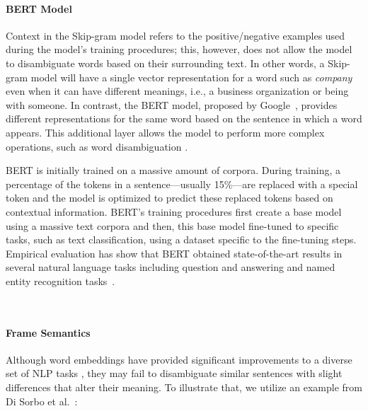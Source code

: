 



\paragraph{\textbf{BERT Model}}
\label{cp5:bert}

Context in the Skip-gram model refers to the positive/negative examples used during the model's training procedures; this, however, does not allow the model to disambiguate words based on their surrounding text. In other words, a Skip-gram model will have a single vector representation for a word such as \textit{company} even when it can have different meanings, i.e., a business organization or being with someone. In contrast, 
the \acf{BERT} model, proposed by Google~\cite{Devlin2018Bert}, provides different representations for the same word based on the sentence in which a word appears.
This additional layer allows the model to perform more complex operations, such as word disambiguation .


BERT is initially trained 
on a massive amount of corpora. During training, a percentage of the tokens in a sentence---usually 15\%---are replaced with a special token and the model is optimized to predict these replaced tokens based on contextual information. 
BERT's training procedures first create a base model using a massive text corpora and then, this base model fine-tuned to specific tasks, such as text classification, using a dataset specific to the fine-tuning steps. 
Empirical evaluation has show that BERT obtained state-of-the-art results in several natural language tasks including  question and answering and named entity recognition tasks~\cite{Devlin2018Bert}. 

~\cite{Lin2021}
~\cite{Araujo2021}




\paragraph{\textbf{Frame Semantics}}
\label{cp5:frame-semantics}


Although word embeddings have provided significant improvements to a diverse set of NLP tasks , they may fail to disambiguate similar sentences with slight differences that alter their meaning. To illustrate that, we utilize an example
from Di Sorbo et al.~\cite{Sorbo2015}:


